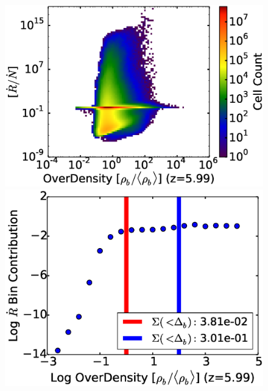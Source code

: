 \begin{figure}[!tp]
\begin{minipage}[h]{0.33\linewidth}
        \includegraphics[trim = 5mm 8mm 0mm 0mm, clip, width=1.0\textwidth]{3_1_HD15100OverDensityRecombIonFrac.eps}
     \end{minipage}
\hspace*{-2.00mm}
    \begin{minipage}[h]{0.33\linewidth}
       \centering
       \includegraphics[trim = 5mm 8mm 0mm 0mm, clip, width=1.0\textwidth]{3_2_HD15100_recomb_contrib_v_OD.eps}
     \end{minipage}
\hspace*{-4.00mm}
    \begin{minipage}[h]{0.33\linewidth}
       \centering

\end{minipage}
\end{figure}
